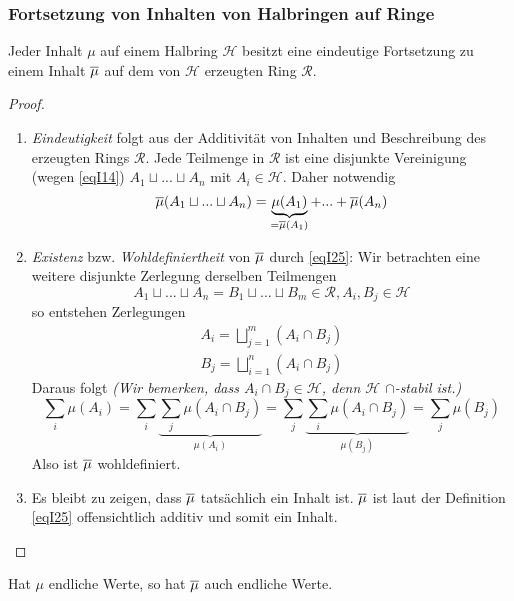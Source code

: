 \subsubsection{Fortsetzung von Inhalten von Halbringen auf Ringe}
\begin{satz}
\begin{mdframed}
Jeder Inhalt $\mu$ auf einem Halbring $\mathcal{H}$ besitzt eine eindeutige Fortsetzung zu einem Inhalt $\overline{\mu}$ auf dem von $\mathcal{H}$ erzeugten Ring $\mathcal{R}$.
\end{mdframed}
\begin{proof} \
\begin{enumerate}[-,topsep=5pt, itemsep = 0 pt]
	\item \emph{Eindeutigkeit} folgt aus der Additivität von Inhalten und Beschreibung des erzeugten Rings $\mathcal{R}$. Jede Teilmenge in $\mathcal{R}$ ist eine disjunkte Vereinigung (wegen \eqref{eqI14}) $A_1 \sqcup ... \sqcup A_n$ mit $A_i \in \mathcal{H}$. Daher notwendig
	\begin{equation} \label{eqI25}
	\overline{\mu} (A_1 \sqcup ... \sqcup A_n) = \underbrace{\mu (A_1)}_{= \overline\mu(A_1)} + ... + \overline\mu (A_n)
	\end{equation}
	\item \emph{Existenz} bzw. \emph{Wohldefiniertheit} von $\overline\mu$ durch \eqref{eqI25}: Wir betrachten eine weitere disjunkte Zerlegung derselben Teilmengen
	\begin{equation*}
	A_1 \sqcup ... \sqcup A_n = B_1 \sqcup ... \sqcup B_m \in \mathcal{R}, A_i, B_j \in \mathcal{H}
	\end{equation*}
	so entstehen Zerlegungen 
	\begin{align*}
		A_i = \bigsqcup_{j=1}^m (A_i \cap B_j)	\\
		B_j = \bigsqcup_{i=1}^n (A_i \cap B_j)
	\end{align*}
	Daraus folgt \emph{(Wir bemerken, dass $A_i \cap B_j \in \mathcal{H}$, denn $\mathcal{H}$ $\cap$-stabil ist.)}
	\begin{equation*}
	\sum_i \mu (A_i ) = \sum_i \underbrace{\sum_j \mu (A_i \cap B_j)}_{\mu (A_i)}
	= \sum_j \underbrace{\sum_i \mu (A_i \cap B_j)}_{\mu (B_j)} = \sum_j \mu (B_j)
	\end{equation*}
	Also ist $\overline\mu$ wohldefiniert.
	\item Es bleibt zu zeigen, dass $\overline\mu$ tatsächlich ein Inhalt ist. $\overline\mu$ ist laut der Definition \eqref{eqI25} offensichtlich additiv und somit ein Inhalt.
\end{enumerate}
\end{proof}
\begin{remark}
Hat $\mu$ endliche Werte, so hat $\overline\mu$ auch endliche Werte.
\end{remark}
\end{satz}
